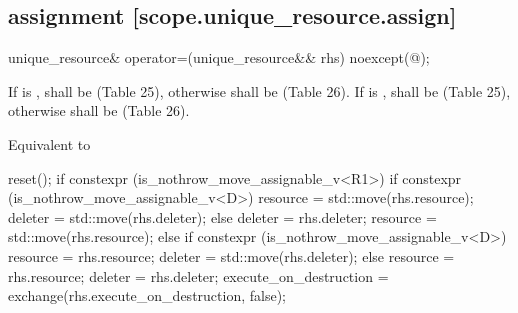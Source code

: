 \documentclass[ebook,11pt,article]{memoir}
\begin{document}
\subsection { assignment [scope.unique_resource.assign]}

\begin{itemdecl}
unique_resource& operator=(unique_resource&& rhs) noexcept(@\seebelow@);
\end{itemdecl}

\begin{itemdescr}
\pnum
\requires 
If  is ,  shall be  (Table 25), otherwise  shall be  (Table 26).
If  is ,  shall be  (Table 25), otherwise  shall be  (Table 26).

\pnum
\effects Equivalent to
\begin{codeblock}
    reset();
    if constexpr (is_nothrow_move_assignable_v<R1>) {
        if constexpr (is_nothrow_move_assignable_v<D>) {
            resource = std::move(rhs.resource); 
            deleter  = std::move(rhs.deleter); 
        } else {
            deleter  = rhs.deleter; 
            resource = std::move(rhs.resource); 
        }
    } else {
        if constexpr (is_nothrow_move_assignable_v<D>) {
            resource = rhs.resource; 
            deleter  = std::move(rhs.deleter); 
        } else {
            resource = rhs.resource; 
            deleter  = rhs.deleter; 
        }
    }
    execute_on_destruction = exchange(rhs.execute_on_destruction, false);
\end{codeblock}


\end{itemdescr}
\end{document}
